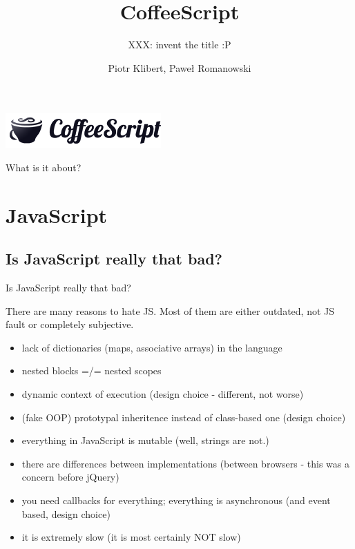 \documentclass[xcolor=dvipsnames]{beamer}
\title{CoffeeScript}
\subtitle{XXX: invent the title :P}
\author{Piotr Klibert, Paweł Romanowski}
\newcommand{\slide}[1]{\begin{frame}[fragile]{{#1}}}
\begin{document}
\begin{frame}[plain]
    \begin{center}
        \includegraphics[scale=0.25]{img/logo.png}
    \end{center}
    \titlepage
\end{frame}

\begin{frame}{What is it about?}
    \tableofcontents
\end{frame}




\section{JavaScript}

\subsection{Is JavaScript really that bad?}
\begin{frame}[fragile]{}
    Is JavaScript really that bad?
\end{frame}

\slide{There are many reasons to hate JS.}
    Most of them are either outdated, not JS fault or completely subjective.
    \begin{itemize}
        \item lack of dictionaries (maps, associative arrays) in the language
        \item nested blocks =/= nested scopes
        \item dynamic context of execution (design choice - different, not worse)
        \item (fake OOP) prototypal inheritence instead of class-based one (design choice)
        \item everything in JavaScript is mutable (well, strings are not.)
        \item there are differences between implementations (between browsers - this was a concern before jQuery)
        \item you need callbacks for everything; everything is asynchronous (and event based, design choice)
        \item it is extremely slow (it is most certainly NOT slow)
    \end{itemize}
\end{frame}
\end{document}
